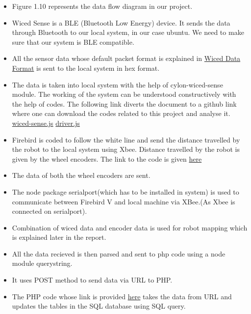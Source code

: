 \documentclass[a4paper,12pt,oneside]{book}
\begin{document}
\begin{itemize}
  \item Figure 1.10 represents the data flow diagram in our project.
  \item Wiced Sense is a BLE (Bluetooth Low Energy) device. It sends the data through Bluetooth to our local system, in our case ubuntu. We need to make sure that our system is BLE compatible.
  \item All the sensor data whose default packet format is explained in \href{https://github.com/eYSIP-2016/Wiced-Sense/blob/master/Documentation/Sensor%20Data%20Format/Sensor_Data_Format.pdf}{Wiced Data Format} is sent to the local system in hex format.

  \item The data is taken into local system with the help of cylon-wiced-sense module. The working of the system can be understood constructively with the help of codes. The following link diverts the document to a github link where one can download the codes related to this project and analyse it.
  \href{https://github.com/eYSIP-2016/Wiced-Sense/blob/master/Codes/Nodejs/wiced-sense.js}{wiced-sense.js}
  \href{https://github.com/eYSIP-2016/Wiced-Sense/blob/master/Codes/Nodejs/driver.js}{driver.js}
  

  \newpage
  \item Firebird is coded to follow the white line and send the distance travelled by the robot to the local system using Xbee. Distance travelled by the robot is given by the wheel encoders. The link to the code is given \href{https://github.com/eYSIP-2016/Wiced-Sense/tree/master/Codes/FireBird_Codes/Firebird2}{here}
  
  \item The data of both the wheel encoders are sent.
  \item The node package serialport(which has to be installed in system) is used to communicate between Firebird V and local machine via XBee.(As Xbee is connected on serialport).
  \item Combination of wiced data and encoder data is used for robot mapping which 
  is explained later in the report.
  \item All the data recieved is then parsed and sent to php code using a node module querystring.
  \item It uses POST method to send data via URL to PHP.
  \item The PHP code whose link is provided \href{https://github.com/eYSIP-2016/Wiced-Sense/blob/master/Codes/wiced%20web/controller/test.php}{here} takes the data from URL and updates the tables in the SQL database using SQL query.
    

\end{itemize}
\end{document}
